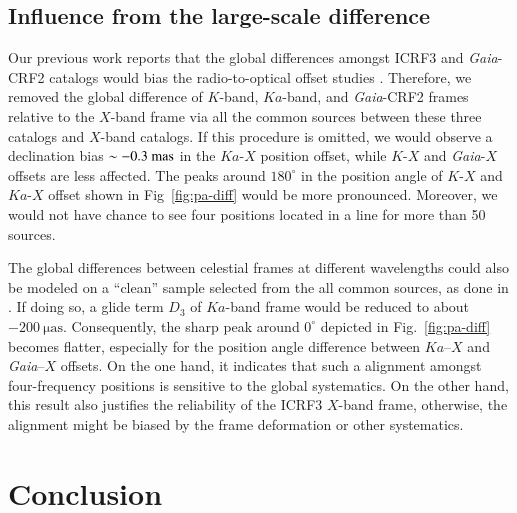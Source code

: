 \documentclass{aa-note}   %
\begin{document}
\subsection{Influence from the large-scale difference} \label{subsec:sys-effect}
Our previous work reports that the global differences amongst ICRF3 and \textit{Gaia}-CRF2 catalogs would bias the radio-to-optical offset studies \citep{2020A&A...634A..28L}.
Therefore, we removed the global difference of $K$-band, $Ka$-band, and \textit{Gaia}-CRF2 frames relative to the $X$-band frame via all the common sources between these three catalogs and $X$-band catalogs.
If this procedure is omitted, we would observe a declination bias $\sim-0.3~{\rm mas}$ in the $Ka$-$X$ position offset, while $K$-$X$ and \textit{Gaia}-$X$ offsets are less affected.
The peaks around $180^\circ$ in the position angle of $K$-$X$ and $Ka$-$X$ offset shown in Fig~\ref{fig:pa-diff} would be more pronounced.
Moreover, we would not have chance to see four positions located in a line for more than 50 sources.

The global differences between celestial frames at different wavelengths could also be modeled on a ``clean'' sample selected from the all common sources, as done in \citet{2020A&A...634A..28L}.
If doing so, a glide term $D_3$ of $Ka$-band frame would be reduced to about $\mathrm{-200~\mu as}$.
Consequently, the sharp peak around $0^{\circ}$ depicted in Fig.~\ref{fig:pa-diff} becomes flatter, especially for the position angle difference between $Ka$--$X$ and \textit{Gaia}--$X$ offsets.
On the one hand, it indicates that such a alignment amongst four-frequency positions is sensitive to the global systematics.
On the other hand, this result also justifies the reliability of the ICRF3 $X$-band frame, otherwise, the alignment might be biased by the frame deformation or other systematics.

\section{Conclusion} \label{sec:conclusions}
\end{document}
